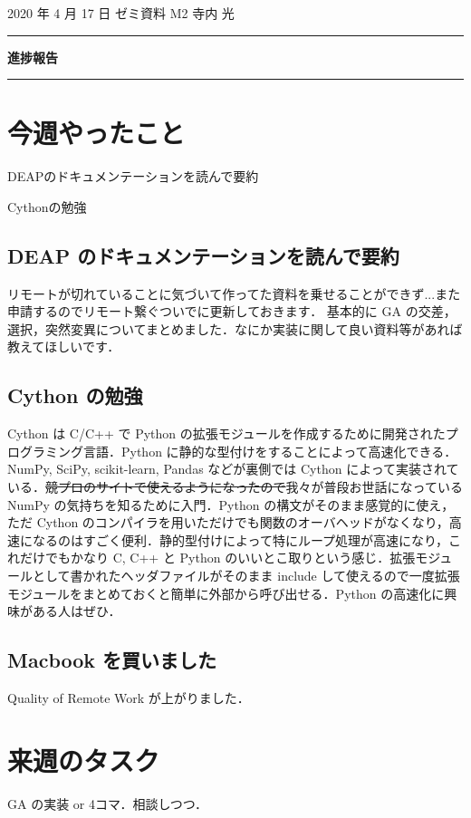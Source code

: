 \documentclass[onecolumn]{ujarticle}   %
\begin{document}
	\noindent

	\hspace{1em}
	2020 年 4 月 17 日
	ゼミ資料
	\hfill
	M2 寺内 光

	\vspace{2mm}

	\hrule

	\begin{center}
		{\Large \bf 進捗報告}
	\end{center}


	\hrule
	\vspace{3mm}

	\section{今週やったこと}
	\begin{itemize}{
		\item{DEAPのドキュメンテーションを読んで要約}
		\item{Cythonの勉強}
	}\end{itemize}
	\subsection{DEAP のドキュメンテーションを読んで要約}
	リモートが切れていることに気づいて作ってた資料を乗せることができず...また申請するのでリモート繋ぐついでに更新しておきます．
	基本的に GA の交差，選択，突然変異についてまとめました．なにか実装に関して良い資料等があれば教えてほしいです．

	\subsection{Cython の勉強}
	Cython は C/C++ で Python の拡張モジュールを作成するために開発されたプログラミング言語．Python に静的な型付けをすることによって高速化できる．NumPy, SciPy, scikit-learn, Pandas などが裏側では Cython によって実装されている．\sout{競プロのサイトで使えるようになったので}我々が普段お世話になっている NumPy の気持ちを知るために入門．Python の構文がそのまま感覚的に使え，ただ Cython のコンパイラを用いただけでも関数のオーバヘッドがなくなり，高速になるのはすごく便利．静的型付けによって特にループ処理が高速になり，これだけでもかなり C, C++ と Python のいいとこ取りという感じ．拡張モジュールとして書かれたヘッダファイルがそのまま include して使えるので一度拡張モジュールをまとめておくと簡単に外部から呼び出せる．Python の高速化に興味がある人はぜひ．

	\subsection{Macbook を買いました}
	Quality of Remote Work が上がりました．

	\section{来週のタスク}
	GA の実装 or 4コマ．相談しつつ．

	
	
\end{document}
